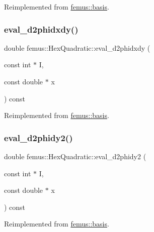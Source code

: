 Reimplemented from \mbox{\hyperlink{classfemus_1_1basis_a0a9839e75d1c9c8302486fc072eed028}{femus\+::basis}}.

\mbox{\label{classfemus_1_1_hex_quadratic_a7725b6736d383a7df2147edef65779de}} 
\subsubsection{\texorpdfstring{eval\+\_\+d2phidxdy()}{eval\_d2phidxdy()}}
{\footnotesize\ttfamily double femus\+::\+Hex\+Quadratic\+::eval\+\_\+d2phidxdy (\begin{DoxyParamCaption}\item[{const int $\ast$}]{I,  }\item[{const double $\ast$}]{x }\end{DoxyParamCaption}) const\hspace{0.3cm}{\ttfamily [virtual]}}



Reimplemented from \mbox{\hyperlink{classfemus_1_1basis_ac9feaf9e60421143db2a3708f3c7fa48}{femus\+::basis}}.

\mbox{\label{classfemus_1_1_hex_quadratic_a99e2c105b81597d25f6c6f991c72235b}} 
\subsubsection{\texorpdfstring{eval\+\_\+d2phidy2()}{eval\_d2phidy2()}}
{\footnotesize\ttfamily double femus\+::\+Hex\+Quadratic\+::eval\+\_\+d2phidy2 (\begin{DoxyParamCaption}\item[{const int $\ast$}]{I,  }\item[{const double $\ast$}]{x }\end{DoxyParamCaption}) const\hspace{0.3cm}{\ttfamily [virtual]}}



Reimplemented from \mbox{\hyperlink{classfemus_1_1basis_a0febb29fe4b32213ff8d6d428f7241cd}{femus\+::basis}}.

